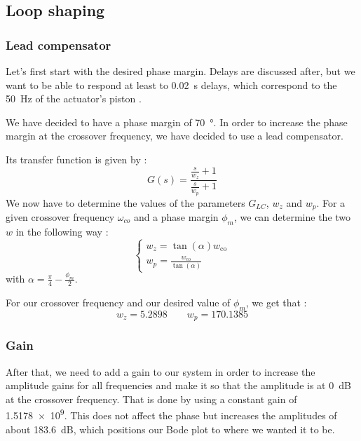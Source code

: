 \subsection{Loop shaping}
\subsubsection{Lead compensator}
Let's first start with the desired phase margin. Delays are discussed after, but we want to be able to respond at least to \SI{0.02}{\second} delays, which correspond to the \SI{50}{\hertz} of the actuator's piston \cite{iopscience_delay}.\par
We have decided to have a phase margin of \SI{70}{\degree}. In order to increase the phase margin at the crossover frequency, we have decided to use a lead compensator.\par
Its transfer function is given by : 
$$
G(s) = \dfrac{\frac{s}{w_z} + 1}{\frac{s}{w_p} +1}
$$
We now have to determine the values of the parameters $G_{LC}$, $w_z$ and $w_p$. For a given crossover frequency $\omega_{co}$ and a phase margin $\phi_m$, we can determine the two $w$ in the following way : 
$$
\left\{\begin{array}{l}
    {w_{z}=\tan (\alpha) w_{\mathrm{co}}} \\
    {w_{p}=\frac{w_{\mathrm{co}}}{\tan (\alpha)}}
\end{array}\right.
$$
with $\alpha = \frac{\pi}{4} - \frac{\phi_m}{2}$.\par
For our crossover frequency and our desired value of $\phi_m$, we get that : 
$$
w_z = \num{5.2898} \qquad w_p = \num{170.1385}
$$

\subsubsection{Gain}
After that, we need to add a gain to our system in order to increase the amplitude gains for all frequencies and make it so that the amplitude is at \SI{0}{\deci\bel} at the crossover frequency. That is done by using a constant gain of \num{1.5178e9}. This does not affect the phase but increases the amplitudes of about \SI{183.6}{\deci\bel}, which positions our Bode plot to where we wanted it to be.

